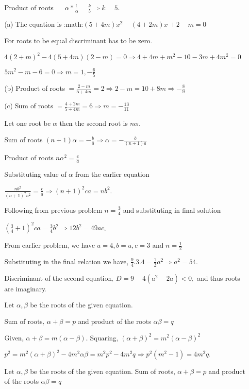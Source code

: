   Product of roots $= \alpha * \frac{1}{\alpha} = \frac{k}{5} \Rightarrow k = 5$.
\item (a) The equation is :math:$(5 + 4m)x^2 - (4 + 2m)x + 2 - m = 0$

  For roots to be equal discriminant has to be zero.

  $4(2 + m)^2 - 4(5 + 4m)(2 - m) = 0\Rightarrow 4 + 4m + m^2 - 10 - 3m + 4m^2 = 0$

  $5m^2 - m - 6 = 0 \Rightarrow m = 1, -\frac{6}{5}$

  (b) Product of roots $= \frac{2 - m}{5 + 4m} = 2 \Rightarrow 2 - m = 10 + 8m \Rightarrow -\frac{8}{9}$

  (c) Sum of roots $= \frac{4 + 2m}{5 + 4m} = 6 \Rightarrow m = -\frac{13}{11}$
\item Let one root be $\alpha$ then the second root is $n\alpha$.

  Sum of roots $(n + 1)\alpha = -\frac{b}{a} \Rightarrow \alpha = -\frac{b}{(n + 1)a}$

  Product of roots $n\alpha^2 = \frac{c}{a}$

  Substituting value of $\alpha$ from the earlier equation

  $\frac{nb^2}{(n + 1)^2a^2} = \frac{c}{a} \Rightarrow (n + 1)^2 ca = nb^2$.
\item Following from previous problem $n = \frac{3}{4}$ and substituting in final solution

  $\left(\frac{3}{4} + 1\right)^2ca = \frac{3}{4}b^2 \Rightarrow 12b^2 = 49ac$.
\item From earlier problem, we have $a = 4, b = a, c = 3$ and $n = \frac{1}{2}$

  Substituting in the final relation we have, $\frac{9}{4}.3.4 = \frac{1}{2}a^2\Rightarrow a^2 = 54$.

  Discriminant of the second equation, $D = 9 - 4(a^2 - 2a) < 0,$ and thus roots are imaginary.
\item Let $\alpha, \beta$ be the roots of the given equation.

  Sum of roots, $\alpha + \beta = p$ and product of the roots $\alpha\beta = q$

  Given, $\alpha + \beta = m(\alpha - \beta)$. Squaring, $(\alpha + \beta)^2 = m^2(\alpha - \beta)^2$

  $p^2 = m^2(\alpha + \beta)^2 - 4m^2\alpha\beta = m^2p^2 - 4m^2q \Rightarrow p^2(m^2 - 1) = 4m^2q$.
\item Let $\alpha, \beta$ be the roots of the given equation. Sum of roots, $\alpha + \beta = p$ and product
  of the roots $\alpha\beta = q$

